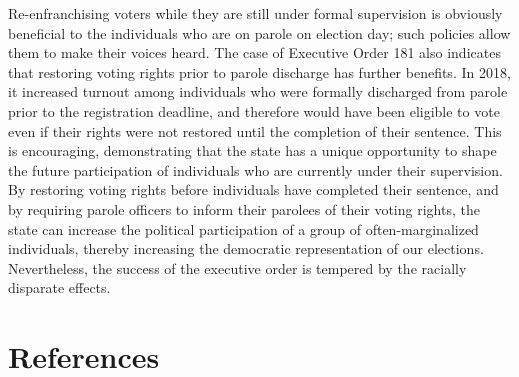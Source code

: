 \documentclass[
  12pt,
]{article}
\begin{document}
Re-enfranchising voters while they are still under formal supervision is obviously beneficial to the individuals who are on parole on election day; such policies allow them to make their voices heard. The case of Executive Order 181 also indicates that restoring voting rights prior to parole discharge has further benefits. In 2018, it increased turnout among individuals who were formally discharged from parole prior to the registration deadline, and therefore would have been eligible to vote even if their rights were not restored until the completion of their sentence. This is encouraging, demonstrating that the state has a unique opportunity to shape the future participation of individuals who are currently under their supervision. By restoring voting rights before individuals have completed their sentence, and by requiring parole officers to inform their parolees of their voting rights, the state can increase the political participation of a group of often-marginalized individuals, thereby increasing the democratic representation of our elections. Nevertheless, the success of the executive order is tempered by the racially disparate effects.

\newpage

\hypertarget{references}{%
\section*{References}\label{references}}
\end{document}
